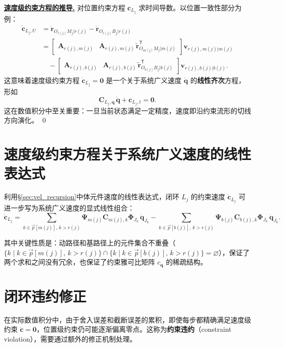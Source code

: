 \documentclass[10pt,a4paper]{book}
\theoremstyle{thmstyle}
\theoremstyle{defstyle}
\theoremstyle{prostyle}
\renewenvironment{proof}[1][证明]{\par{\kaishu \underline{\textbf{#1.}}} \;\fangsong}{\qed\par}
\newcommand{\T}{^{\mathsf{T}}}
\renewcommand{\vec}[1]{\bm{#1}}
\newcommand{\mat}[1]{\bm{#1}}
\newcommand{\tildev}[1]{\tilde{#1}}
\begin{document}
\begin{proof}[速度级约束方程的推导]
对位置约束方程 $\vec{c}_{L_j}$ 求时间导数。以位置一致性部分为例：
\begin{align}
\dot{\vec{c}}_{L_j,U}
&= \dot{\vec{r}}_{O_{r(j)}M_j|r(j)} - \dot{\vec{r}}_{O_{r(j)}B_j|r(j)} \\
&= \begin{bmatrix}\mat{A}_{r(j),m(j)} & \mat{A}_{r(j),m(j)}\,\tildev{\vec{r}}_{O_{m(j)}M_j|m(j)}\T\end{bmatrix}
\vec{v}_{r(j),m(j)|m(j)} \\
&\quad - \begin{bmatrix}\mat{A}_{r(j),b(j)} & \mat{A}_{r(j),b(j)}\,\tildev{\vec{r}}_{O_{b(j)}B_j|b(j)}\T\end{bmatrix}
\vec{v}_{r(j),b(j)|b(j)}.
\end{align}
这意味着速度级约束方程 $\dot{\vec{c}}_{L_j} = \vec{0}$ 是一个关于系统广义速度 $\dot{\vec{q}}$ 的\textbf{线性齐次}方程，形如
\[
\mat{C}_{L_j,\vec{q}}\,\dot{\vec{q}} + \vec{c}_{L_j,t} = \vec{0}.
\]
这在数值积分中至关重要：一旦当前状态满足一定精度，速度即沿约束流形的切线方向演化。
\end{proof}


\section{速度级约束方程关于系统广义速度的线性表达式}

利用\S\ref{sec:vel_recursion}中体元件速度的线性表达式，闭环 $L_j$ 的约束速度 $\dot{\vec{c}}_{L_j}$ 可进一步写为系统广义速度的显式线性组合：
\begin{equation}
\dot{\vec{c}}_{L_j} = \sum_{k\in\overrightarrow{p}[m(j)],\,k>r(j)} \mat{\Psi}_{m(j)}\mat{C}_{m(j),k}\mat{\Phi}_{J_k}\,\dot{\vec{q}}_{J_k}
- \sum_{k\in\overrightarrow{p}[b(j)],\,k>r(j)} \mat{\Psi}_{b(j)}\mat{C}_{b(j),k}\mat{\Phi}_{J_k}\,\dot{\vec{q}}_{J_k}.
\label{eq:constraint_vel_linear}
\end{equation}

其中关键性质是：动路径和基路径上的元件集合不重叠（$\{k \mid k\in\overrightarrow{p}[m(j)],\,k > r(j)\}\cap\{k \mid k\in\overrightarrow{p}[b(j)],\,k > r(j)\} = \varnothing$），保证了两个求和之间没有冗余，也保证了约束雅可比矩阵 $c_{\vec{q}}$ 的稀疏结构。


\section{闭环违约修正}

在实际数值积分中，由于舍入误差和截断误差的累积，即使每步都精确满足速度级约束 $\dot{\vec{c}} = \vec{0}$，位置级约束仍可能逐渐偏离零点。这称为\textbf{约束违约}（constraint violation），需要通过额外的修正机制处理。
\end{document}
